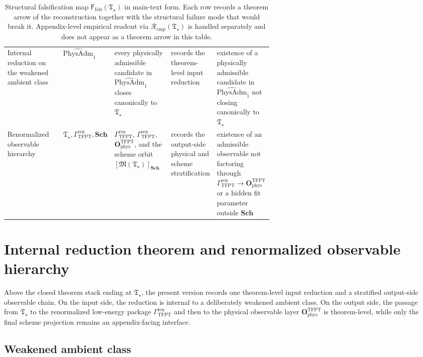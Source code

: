 \documentclass[11pt,a4paper]{article}
\theoremstyle{definition}
\theoremstyle{remark}
\newcommand{\Tstar}{\mathfrak T_{\star}}
\newcommand{\Ffals}{\mathsf F_{\mathrm{fals}}}
\newcommand{\Rcmp}{\mathcal R_{\mathrm{cmp}}}
\newcommand{\PhysAdmOne}{\widehat{\mathrm{PhysAdm}}_1}
\newcommand{\GrenTFPT}{\Gamma_{\mathrm{TFPT}}^{\mathrm{ren}}}
\newcommand{\OphysTFPT}{\mathbf O_{\mathrm{phys}}^{\mathrm{TFPT}}}
\newcommand{\SchGrp}{\mathbf{Sch}}
\newcommand{\Mop}{\mathfrak M}
\begin{document}
\begin{table}[p]
\begin{tabularx}{\linewidth}{@{}>{\raggedright\arraybackslash}p{0.22\linewidth}>{\raggedright\arraybackslash}p{0.18\linewidth}>{\raggedright\arraybackslash}p{0.22\linewidth}YY@{}}
Internal reduction on the weakened ambient class & $\PhysAdmOne$ & every physically admissible candidate in $\PhysAdmOne$ closes canonically to $\Tstar$ & records the theorem-level input reduction & existence of a physically admissible candidate in $\PhysAdmOne$ not closing canonically to $\Tstar$ \\
Renormalized observable hierarchy & $\Tstar,\GrenTFPT,\SchGrp$ & $\Gamma_{\mathrm{TFPT}}^{\mathrm{ren}}$, $\GrenTFPT$, $\OphysTFPT$, and the scheme orbit $[\Mop(\Tstar)]_{\SchGrp}$ & records the output-side physical and scheme stratification & existence of an admissible observable not factoring through $\GrenTFPT\to\OphysTFPT$ or a hidden fit parameter outside $\SchGrp$ \\
\bottomrule
\end{tabularx}
\caption{Structural falsification map $\Ffals(\Tstar)$ in main-text form. Each row records a
theorem arrow of the reconstruction together with the structural failure mode that would break
it. Appendix-level empirical readout via $\Rcmp(\Tstar)$ is handled separately and does not
appear as a theorem arrow in this table.}
\label{tab:proof-obligations}
\end{table}

\section{Internal reduction theorem and renormalized observable hierarchy}
\label{sec:universality-operational}

Above the closed theorem stack ending at $\Tstar$, the present version records one theorem-level
input reduction and a stratified output-side observable chain. On the input side, the reduction is
internal to a deliberately weakened ambient class. On the output side, the passage from $\Tstar$ to
the renormalized low-energy package $\GrenTFPT$ and then to the physical observable layer
$\OphysTFPT$ is theorem-level, while only the final scheme projection remains an appendix-facing
interface.

\subsection{Weakened ambient class}
\end{document}
